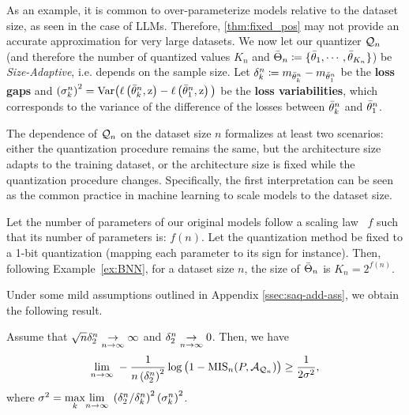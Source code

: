 As an example, it is common to over-parameterize models relative to the dataset size, as seen in the case of LLMs. 
Therefore, \autoref{thm:fixed_pos} may not provide an accurate approximation for very large datasets. 
We now let our quantizer \( {\mathcal{Q}}_n  \) (and therefore the number of quantized values $K_n$ and ${\Bar{\Theta}}_n\coloneqq\{{\Bar{\theta}}_1,\cdots,{\Bar{\theta}}_{K_n}\}$) be \textit{Size-Adaptive}, i.e. depends on the sample size. Let $\delta_k^n\coloneqq m_{{\Bar{\theta}}^n_k}-m_{{\Bar{\theta}}^n_1}$ be the \textbf{loss gaps} and  $\left(\sigma_k^n\right)^2 = \textrm{Var}\big(\ell\left({\Bar{\theta}}^n_k,{\textnormal{z}}\right) - \ell\left({\Bar{\theta}}^n_1,{\textnormal{z}}\right) \big)$ be the \textbf{loss variabilities}, which corresponds to the variance of the difference of the losses between ${\Bar{\theta}}^n_k$ and ${\Bar{\theta}}^n_1$. 

The dependence of \( {\mathcal{Q}}_n \) on the dataset size \( n \) formalizes at least two scenarios: either the quantization procedure remains the same, but the architecture size adapts to the training dataset, or the architecture size is fixed while the quantization procedure changes. Specifically, the first interpretation can be seen as the common practice in machine learning to scale models to the dataset size.
\begin{example}
Let the number of parameters of our original models follow a scaling law~\cite{hoffmann2022trainingcomputeoptimallargelanguage, kaplan2020scalinglawsneurallanguage} $f$ such that its number of parameters is: $f(n)$. Let the quantization method be fixed to a 1-bit quantization (mapping each parameter to its sign for instance).
Then, following Example~\ref{ex:BNN}, for a dataset size $n$, the size of ${\Bar{\Theta}}_n$ is $K_n=2^{f(n)}$.
\end{example}
Under some mild assumptions outlined in Appendix \ref{ssec:saq-add-ass}, we obtain the following result.
\begin{theorem}\label{thm:seqQ} Assume that ${\sqrt{n}\delta_{2}^n\underset{n\to\infty}{\to}\infty}$ and ${\delta_{2}^n\underset{n\to\infty}{\to}0}$. Then, we have
\begin{equation}
    \underset{n\to\infty}{\lim}\;-\frac{1}{n\left(\delta_{2}^n\right)^2}\log\big(1-\text{MIS}_n(P, {\mathcal{A}}_{{\mathcal{Q}}_n})\big)\geq \frac{1}{2\sigma^2},
\end{equation}
where $\sigma^2 = \underset{k}{\max} \underset{n\to\infty}{\lim}\; \left(\delta_{2}^n/\delta_{k}^n\right)^2\left(\sigma_k^n\right)^2$.
\end{theorem}



